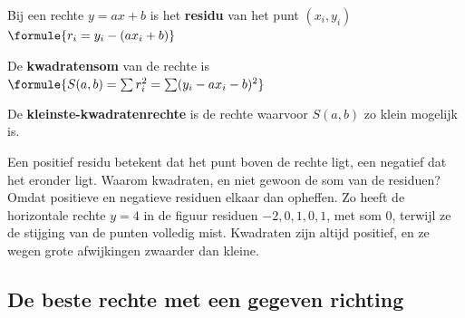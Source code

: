 \begin{theorie}
Bij een rechte $y = ax + b$ is het \textbf{\textcolor{accent}{residu}} van het punt $(x_i, y_i)$ \qquad $\formule{r_i = y_i - (ax_i + b)}$

\vspace{1mm}
De \textbf{\textcolor{accent}{kwadratensom}} van de rechte is \qquad $\formule{S(a, b) = \sum r_i^2 = \sum (y_i - ax_i - b)^2}$

\vspace{1mm}
De \textbf{\textcolor{accent}{kleinste-kwadratenrechte}} is de rechte waarvoor $S(a, b)$ zo klein mogelijk is.
\end{theorie}

Een positief residu betekent dat het punt boven de rechte ligt, een negatief dat het eronder ligt. Waarom kwadraten, en niet gewoon de som van de residuen? Omdat positieve en negatieve residuen elkaar dan opheffen. Zo heeft de horizontale rechte $y = 4$ in de figuur residuen $-2, 0, 1, 0, 1$, met som $0$, terwijl ze de stijging van de punten volledig mist. Kwadraten zijn altijd positief, en ze wegen grote afwijkingen zwaarder dan kleine.


\begin{oefeningen}
\end{oefeningen}

\subsection{De beste rechte met een gegeven richting}

